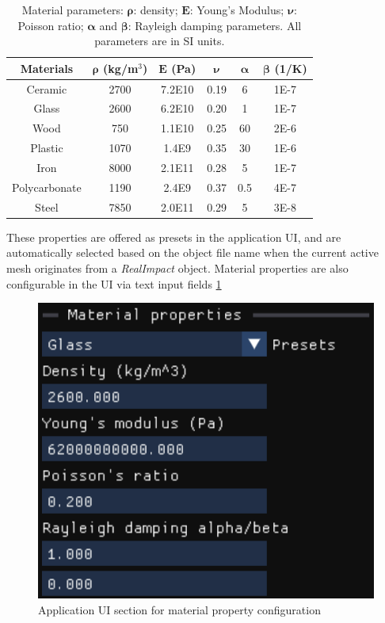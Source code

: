 \documentclass[12pt]{article}
\begin{document}
\begin{table}[ht]
  \centering
  \caption{Material parameters: $\boldsymbol{\rho}$:
  density; $\boldsymbol{E}$: Young’s Modulus; $\boldsymbol{\nu}$: Poisson ratio; $\boldsymbol{\alpha}$ and $\boldsymbol{\beta}$: Rayleigh
  damping parameters. All parameters are in SI units.}
  \label{tab:MaterialProperties}
  \begin{tabular}{|c|c|c|c|c|c|}
  \hline
  \textbf{Materials} & $\boldsymbol{\rho}$ (kg/m$^3$) & $\boldsymbol{E}$ (Pa) & $\boldsymbol{\nu}$ & $\boldsymbol{\alpha}$ & $\boldsymbol{\beta}$ (1/K) \\
  \hline
  Ceramic       & 2700 & 7.2E10 & 0.19 & 6   & 1E-7 \\
  Glass         & 2600 & 6.2E10 & 0.20 & 1   & 1E-7 \\
  Wood          & 750  & 1.1E10 & 0.25 & 60  & 2E-6 \\
  Plastic       & 1070 & 1.4E9  & 0.35 & 30  & 1E-6 \\
  Iron          & 8000 & 2.1E11 & 0.28 & 5   & 1E-7 \\
  Polycarbonate & 1190 & 2.4E9  & 0.37 & 0.5 & 4E-7 \\
  Steel         & 7850 & 2.0E11 & 0.29 & 5   & 3E-8 \\
  \hline
  \end{tabular}
\end{table}

These properties are offered as presets in the application UI, and are automatically selected based on the object file name when the current active mesh originates from a \textit{RealImpact} object.
Material properties are also configurable in the UI via text input fields \ref{fig:MaterialProperties}

\begin{figure}
  \centering
  \includegraphics[width=0.5\linewidth]{images/MaterialProperties.png}
  \caption{Application UI section for material property configuration}
  \label{fig:MaterialProperties}
\end{figure}
\end{document}
